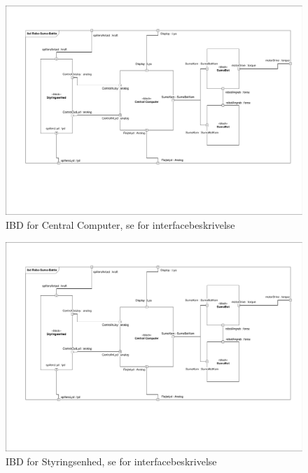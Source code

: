 \begin{figure}
	\centering
   	\includegraphics[page=3,width=1\linewidth]{figs/Diagrammer/IBD.pdf}
	\caption{IBD for Central Computer, se  for interfacebeskrivelse}
	\label{fig:IBD_CentralComputer}
\end{figure}
\begin{figure}
	\centering
   	\includegraphics[page=2,width=1\linewidth]{figs/Diagrammer/IBD.pdf}
	\caption{IBD for Styringsenhed, se  for interfacebeskrivelse}
	\label{fig:IBD_Styringsenhed}
\end{figure}
